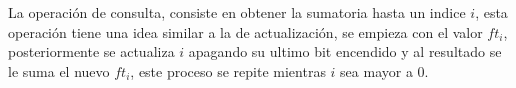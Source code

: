 \documentclass[12pt, a4paper]{article}
\newcommand\cppfile[2][]{

}
\begin{document}
	La operación de consulta, consiste en obtener la sumatoria hasta un indice $i$, esta operación tiene una idea 
	similar a la de actualización, se empieza con el valor $ft_{i}$, posteriormente se actualiza $i$ apagando su ultimo  
	bit encendido y al resultado se le suma el nuevo $ft_{i}$, este proceso se repite mientras $i$ sea mayor a $0$.
	\cppfile[8-46]{Estructuras_de_datos/codigos/fenwick_tree.cpp}
	
	
	
	
\end{document}
